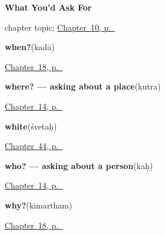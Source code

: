 \noindent\begin{minipage}[t]{\linewidth}
\raggedright
\textbf{What You'd Ask For}\par
\footnotesize chapter topic; \hyperref[ch:sa-request-nouns]{Chapter~10, p.~\pageref*{ch:sa-request-nouns}}
\end{minipage}\par\smallskip

\noindent\begin{minipage}[t]{\linewidth}
\raggedright
\textbf{when?}\enspace\emph{}\enspace(kadā)\par
\footnotesize \hyperref[ch:sa-asking]{Chapter~18, p.~\pageref*{ch:sa-asking}}
\end{minipage}\par\smallskip

\noindent\begin{minipage}[t]{\linewidth}
\raggedright
\textbf{where? — asking about a place}\enspace\emph{}\enspace(kutra)\par
\footnotesize \hyperref[ch:sa-pointing-and-asking]{Chapter~14, p.~\pageref*{ch:sa-pointing-and-asking}}
\end{minipage}\par\smallskip

\noindent\begin{minipage}[t]{\linewidth}
\raggedright
\textbf{white}\enspace\emph{}\enspace(śvetaḥ)\par
\footnotesize \hyperref[ch:sa-colours]{Chapter~44, p.~\pageref*{ch:sa-colours}}
\end{minipage}\par\smallskip

\noindent\begin{minipage}[t]{\linewidth}
\raggedright
\textbf{who? — asking about a person}\enspace\emph{}\enspace(kaḥ)\par
\footnotesize \hyperref[ch:sa-pointing-and-asking]{Chapter~14, p.~\pageref*{ch:sa-pointing-and-asking}}
\end{minipage}\par\smallskip

\noindent\begin{minipage}[t]{\linewidth}
\raggedright
\textbf{why?}\enspace\emph{}\enspace(kimartham)\par
\footnotesize \hyperref[ch:sa-asking]{Chapter~18, p.~\pageref*{ch:sa-asking}}
\end{minipage}\par\smallskip


